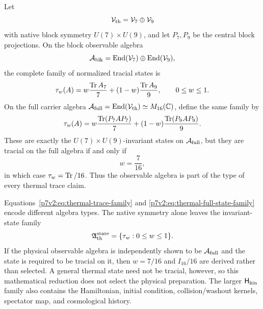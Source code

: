 \documentclass[12pt,a4paper]{article}
\newcommand{\Hkin}{\mathsf{H}_{\rm kin}}
\begin{document}
\begin{theorem}
\label{p7v2:thm:thermal-trace-nonunique}
Let
\[
 \mathcal V_{\rm th}
 =
 \mathcal V_7\oplus\mathcal V_9
\]
with native block symmetry \(U(7)\times U(9)\), and let \(P_7,P_9\) be the
central block projections.  On the block observable algebra
\[
 \mathcal A_{\rm blk}
 =\operatorname{End}(\mathcal V_7)\oplus\operatorname{End}(\mathcal V_9),
\]
the complete family of normalized tracial states is
\begin{equation}
\label{p7v2:eq:thermal-trace-family}
 \tau_w(A)
 =
 w\frac{\operatorname{Tr} A_7}{7}
 +(1-w)\frac{\operatorname{Tr} A_9}{9},
 \qquad 0\leq w\leq1.
\end{equation}
On the full carrier algebra
\(\mathcal A_{\rm full}=\operatorname{End}(\mathcal V_{\rm th})\simeq M_{16}(\mathbb{C})\), define
the same family by
\begin{equation}
\label{p7v2:eq:thermal-full-state-family}
 \tau_w(A)
 =w\frac{\operatorname{Tr}(P_7AP_7)}7
 +(1-w)\frac{\operatorname{Tr}(P_9AP_9)}9.
\end{equation}
These are exactly the \(U(7)\times U(9)\)-invariant states on
\(\mathcal A_{\rm full}\), but they are tracial on the full algebra if and only
if
\[
 \boxed{w=\frac7{16}},
\]
in which case \(\tau_w=\operatorname{Tr}/16\).  Thus the observable algebra is part of the
type of every thermal trace claim.
\end{theorem}

\begin{remark}
Equations~\eqref{p7v2:eq:thermal-trace-family} and
\eqref{p7v2:eq:thermal-full-state-family} encode different algebra types.  The
native symmetry alone leaves the invariant-state family
\[
 \mathfrak A_{\rm th}^{\rm state}=\{\tau_w:0\leq w\leq1\}.
\]
If the physical observable algebra is independently shown to be
\(\mathcal A_{\rm full}\) and the state is required to be tracial on it, then
\(w=7/16\) and \(I_{16}/16\) are derived rather than selected.  A general
thermal state need not be tracial, however, so this mathematical reduction
does not select the physical preparation.  The larger \(\Hkin\) family also
contains the Hamiltonian, initial condition, collision/washout kernels,
spectator map, and cosmological history.
\end{remark}
\end{document}
